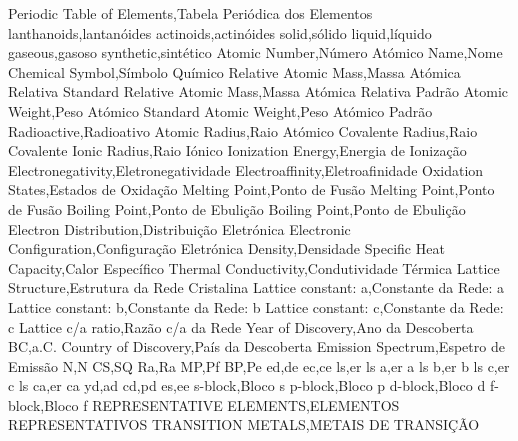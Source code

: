 %
Periodic Table of Elements,Tabela Peri\'{o}dica dos Elementos
lanthanoids,lantan\'{o}ides
actinoids,actin\'{o}ides
solid,s\'{o}lido
liquid,l\'{i}quido
gaseous,gasoso
synthetic,sint\'{e}tico
Atomic Number,N\'{u}mero At\'{o}mico
Name,Nome
Chemical Symbol,S\'{i}mbolo Qu\'{i}mico
Relative Atomic Mass,Massa \mbox{At\'{o}mica} Relativa
Standard Relative Atomic Mass,Massa At\'{o}mica Relativa Padr\~{a}o
Atomic Weight,Peso At\'{o}mico
Standard Atomic Weight,Peso At\'{o}mico Padr\~{a}o
Radioactive,Radioativo
Atomic Radius,Raio At\'{o}mico
Covalente Radius,Raio \mbox{Covalente}
Ionic Radius,Raio I\'{o}nico
Ionization Energy,Energia de Ioniza\c{c}\~{a}o
Electronegativity,Eletrone\-gatividade
Electroaffinity,Eletro\-afinidade
Oxidation States,Estados de Oxida\c{c}\~{a}o
Melting Point,Ponto de Fus\~{a}o
Melting Point,Ponto de Fus\~{a}o
Boiling Point,Ponto de Ebuli\c{c}\~{a}o
Boiling Point,Ponto de Ebuli\c{c}\~{a}o
Electron Distribution,Distribui\c{c}\~{a}o Eletr\'{o}nica
Electronic Configuration,Configura\c{c}\~{a}o Eletr\'{o}nica
Density,Densidade
Specific Heat Capacity,Calor \mbox{Espec\'{i}fico}
Thermal Conductivity,Condutividade T\'{e}rmica
Lattice Structure,Estrutura da Rede Cristalina
Lattice constant: a,Constante da Rede: a
Lattice constant: b,Constante da Rede: b
Lattice constant: c,Constante da Rede: c
Lattice c/a ratio,Raz\~{a}o c\mbox{/}a da Rede
Year of Discovery,Ano da \mbox{Descoberta}
BC,a.C.
Country of Discovery,Pa\'{i}s da \mbox{Descoberta}
Emission Spectrum,Espetro de Emiss\~{a}o
N,N
CS,SQ
Ra,Ra
MP,Pf
BP,Pe
ed,de
ec,ce
ls,er
ls a,er a
ls b,er b
ls c,er c
ls ca,er ca
yd,ad
cd,pd
es,ee
s-block,Bloco s
p-block,Bloco p
d-block,Bloco d
f-block,Bloco f
REPRESENTATIVE ELEMENTS,ELEMENTOS REPRESENTATIVOS
TRANSITION METALS,METAIS DE TRANSI\c{C}\~{A}O
